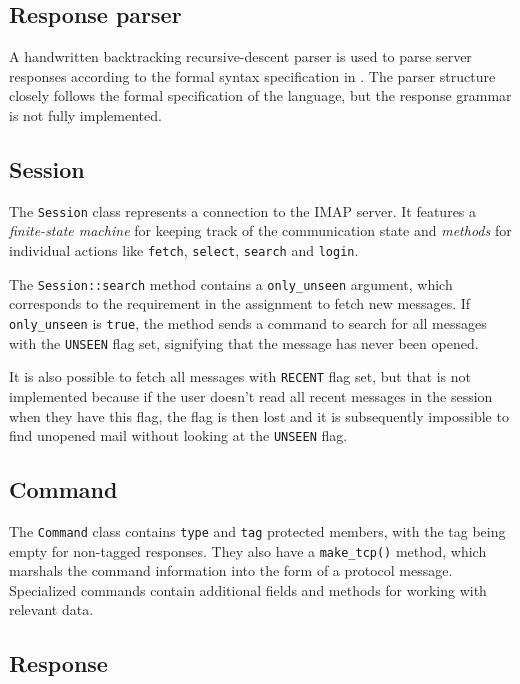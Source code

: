 \documentclass[a4]{report}
\begin{document}
\subsection{Response parser}

A handwritten backtracking recursive-descent parser is used to parse server responses according to the formal syntax specification in \cite{rfc3501}. The parser structure closely follows the formal specification of the language, but the response grammar is not fully implemented.

\subsection{Session}

The \texttt{Session} class represents a connection to the IMAP server. It features a \textit{finite-state machine} for keeping track of the communication state and \textit{methods} for individual actions like \texttt{fetch}, \texttt{select}, \texttt{search} and \texttt{login}.

The \texttt{Session::search} method contains a \texttt{only\_unseen} argument, which corresponds to the requirement in the assignment to fetch new messages. If \texttt{only\_unseen} is \texttt{true}, the method sends a command to search for all messages with the \texttt{UNSEEN} flag set, signifying that the message has never been opened.

It is also possible to fetch all messages with \texttt{RECENT} flag set, but that is not implemented because if the user doesn't read all recent messages in the session when they have this flag, the flag is then lost and it is subsequently impossible to find unopened mail without looking at the \texttt{UNSEEN} flag.

\subsection{Command}

The \texttt{Command} class contains \texttt{type} and \texttt{tag} protected members, with the tag being empty for non-tagged responses. They also have a \texttt{make\_tcp()} method, which marshals the command information into the form of a protocol message. Specialized commands contain additional fields and methods for working with relevant data.

\subsection{Response}
\end{document}
